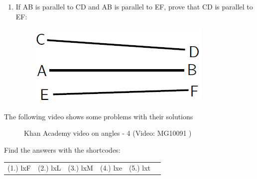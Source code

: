 \begin{enumerate}[noitemsep, label=\textbf{\arabic*}. ]
\begin{enumerate}[noitemsep, label=\textbf{\alph*}. ]
\begin{figure}[H]
\begin{center}
      \vspace{2pt}
    \vspace{.1in}
    \end{center}
 \end{figure}       \end{enumerate}
                \item If AB is parallel to CD and AB is parallel to EF, prove that CD is parallel to EF:
    \setcounter{subfigure}{0}
	\begin{figure}[H] %
    \begin{center}
    \label{m39370*id317408!!!underscore!!!media}\label{m39370*id317408!!!underscore!!!printimage}\includegraphics[width=.5\columnwidth]{col11306.imgs/m39370_MG10C13_021.png} %
      \vspace{2pt}
    \vspace{.1in}
    \end{center}
 \end{figure}               \end{enumerate}
        \label{m39370*eip-115}The following video shows some problems with their solutions
    \setcounter{subfigure}{0}
	\begin{figure}[H] %
    \textnormal{Khan Academy video on angles - 4}\vspace{.1in} \nopagebreak
  \label{m39370*yt-media4}\label{m39370*yt-video4}
             { (Video:  MG10091 )}
      \vspace{2pt}
    \vspace{.1in}
 \end{figure}       \par 
  \label{m39370**end}
\par {} Find the answers with the shortcodes:
 \par \begin{tabular}[h]{cccccc}
 (1.) lxF  &  (2.) lxL  &  (3.) lxM  &  (4.) lxe  &  (5.) lxt  & \end{tabular}
